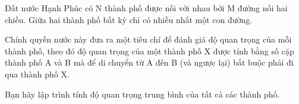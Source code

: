 Đất nước Hạnh Phúc có N thành phố được nối với nhau bởi M đường nối hai chiều. Giữa hai thành phố bất kỳ chỉ có nhiều nhất một con đường.

Chính quyền nước này đưa ra một tiêu chí để đánh giá độ quan trọng của mỗi thành phố, theo đó độ quan trọng của một thành phố X được tính bằng số cặp thành phố A và B mà để di chuyển từ A đến B (và ngược lại) bắt buộc phải đi qua thành phố X.

Bạn hãy lập trình tính độ quan trọng trung bình của tất cả các thành phố.

\